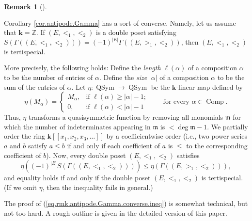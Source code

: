 \documentclass[numbers=enddot,12pt,final,onecolumn,notitlepage,abstracton]{scrartcl}%
\theoremstyle{definition}
\newtheorem{remk}[theo]{Remark}
\newenvironment{remark}[1][]
{\begin{remk}[#1]\begin{leftbar}}
{\end{leftbar}\end{remk}}
\newcommand{\kk}{{\mathbf{k}}}
\newcommand{\Comp}{{\operatorname{Comp}}}
\newcommand{\QSym}{{\operatorname{QSym}}}
\newcommand{\ZZ}{{\mathbb{Z}}}
\begin{document}
\begin{remark}
\label{rmk.antipode.Gamma.converse}
Corollary \ref{cor.antipode.Gamma} has a
sort of converse. Namely, let us assume that $\kk = \ZZ$. If
$\left(  E,<_{1},<_{2}\right)  $ is a double poset satisfying $S\left(
\Gamma\left(  \left(  E,<_{1},<_{2}\right)  \right)  \right)  =\left(
-1\right)  ^{\left\vert E\right\vert }\Gamma\left(  \left(  E,>_{1}%
,<_{2}\right)  \right)  $, then $\left(  E,<_{1},<_{2}\right)  $ is tertispecial.

More precisely, the following holds: Define the \textit{length} $\ell\left(
\alpha\right)  $ of a composition $\alpha$ to be the number of entries of
$\alpha$. Define the \textit{size} $\left\vert \alpha\right\vert $ of a
composition $\alpha$ to be the sum of the entries of $\alpha$. Let
$\eta : \QSym \to \QSym$ be the $\kk$-linear map defined by
\[
\eta \left( M_{\alpha} \right)
=
\begin{cases}
M_{\alpha}, & \text{if }\ell\left(  \alpha\right)  \geq\left\vert
\alpha\right\vert -1;\\
0, & \text{if }\ell\left(  \alpha\right)  <\left\vert \alpha\right\vert -1
\end{cases}
\qquad \text{for every } \alpha \in \Comp .
\]
Thus, $\eta$ transforms a quasisymmetric function by removing all monomials
$\mathfrak{m}$ for which the number of indeterminates appearing in
$\mathfrak{m}$ is $<\deg\mathfrak{m}-1$. We partially order the ring
$\mathbf{k}\left[  \left[ x_1, x_2, x_3, \ldots \right]  \right]  $
by a coefficientwise
order (i.e., two power series $a$ and $b$ satisfy $a\leq b$ if and only if
each coefficient of $a$ is $\leq$ to the corresponding coefficient of $b$).
Now, every double poset $\left(  E,<_{1},<_{2}\right)  $ satisfies
\begin{equation}
\eta\left(  \left(  -1\right)  ^{\left\vert E\right\vert }S\left(
\Gamma\left(  \left(  E,<_{1},<_{2}\right)  \right)  \right)  \right)
\leq\eta\left(  \Gamma\left(  \left(  E,>_{1},<_{2}\right)  \right)  \right)
,\label{eq.rmk.antipode.Gamma.converse.ineq}%
\end{equation}
and equality holds if and only if the double poset $\left(  E,<_{1}%
,<_{2}\right)  $ is tertispecial. (If we omit $\eta$, then the inequality
fails in general.)

The proof of (\ref{eq.rmk.antipode.Gamma.converse.ineq}) is somewhat
technical, but not too hard. A rough outline is given in the detailed
version of this paper.
\end{remark}
\end{document}

